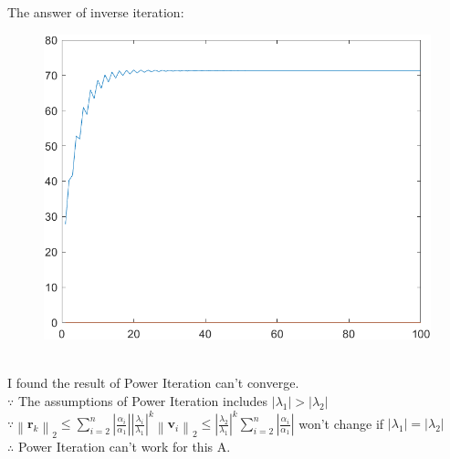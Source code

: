\documentclass[english,onecolumn]{IEEEtran}
\begin{document}
\begin{enumerate}
	The answer of inverse iteration:
    	\begin{figure}[ht]
    		\centering
		\includegraphics[scale=0.7]{inverse.png}
	\end{figure}\\
	I found the result of Power Iteration can't converge.\\
	$\because $ The assumptions of Power Iteration includes $|\lambda_1|>|\lambda_2|$\\
	$\because \left\|\mathbf{r}_{k}\right\|_{2} \leq \sum_{i=2}^{n}\left|\frac{\alpha_{i}}{\alpha_{1}}\right|\left|\frac{\lambda_{i}}{\lambda_{1}}\right|^{k}\left\|\mathbf{v}_{i}\right\|_{2} \leq\left|\frac{\lambda_{2}}{\lambda_{1}}\right|^{k} \sum_{i=2}^{n}\left|\frac{\alpha_{i}}{\alpha_{1}}\right|$ won't change if $|\lambda_1|=|\lambda_2|$\\
    	$\therefore $ Power Iteration can't work for this A.\\
\end{enumerate}


\newpage 
\end{document}
